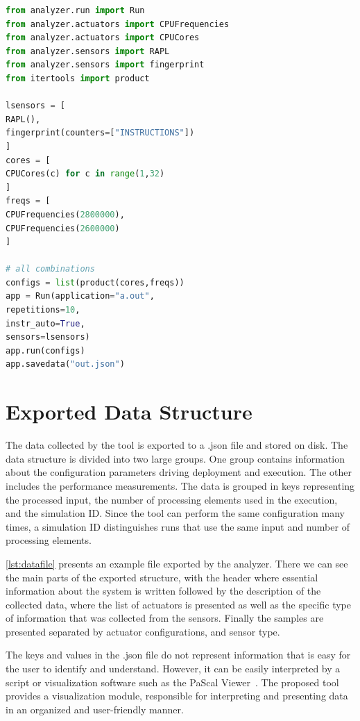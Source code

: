 \lstset{style=pythonStyle,frame=tb}
\begin{lstlisting}[label={lst:pascal_api}, language=python, caption={Python script showing some API features provided by the tool, on how a custom run can be configured.}, captionpos=b]
from analyzer.run import Run
from analyzer.actuators import CPUFrequencies
from analyzer.actuators import CPUCores
from analyzer.sensors import RAPL
from analyzer.sensors import fingerprint
from itertools import product

lsensors = [
RAPL(), 
fingerprint(counters=["INSTRUCTIONS"])
]
cores = [
CPUCores(c) for c in range(1,32)
]
freqs = [
CPUFrequencies(2800000), 
CPUFrequencies(2600000)
]

# all combinations
configs = list(product(cores,freqs))
app = Run(application="a.out",
repetitions=10, 
instr_auto=True, 
sensors=lsensors)
app.run(configs)
app.savedata("out.json")
\end{lstlisting}



\section{Exported Data Structure} \label{sec:exported_data_structure}

The data collected by the tool is exported to a .json file and stored on disk. The data structure is divided into two large groups. One group contains information about the configuration parameters driving deployment and execution. The other includes the performance measurements. The data is grouped in keys representing the processed input, the number of processing elements used in the execution, and the simulation ID. Since the tool can perform the same configuration many times, a simulation ID distinguishes runs that use the same input and number of processing elements.


\cref{lst:datafile} presents an example file exported by the analyzer. There we can see the main parts of the exported structure, with the header where essential information about the system is written followed by the description of the collected data, where the list of actuators is presented as well as the specific type of information that was collected from the sensors. Finally the samples are presented separated by actuator configurations, and sensor type.

The keys and values in the .json file do not represent information that is easy for the user to identify and understand. However, it can be easily interpreted by a script or visualization software such as the PaScal Viewer~\cite{Silva2018}. The proposed tool provides a visualization module, responsible for interpreting and presenting data in an organized and user-friendly manner.

